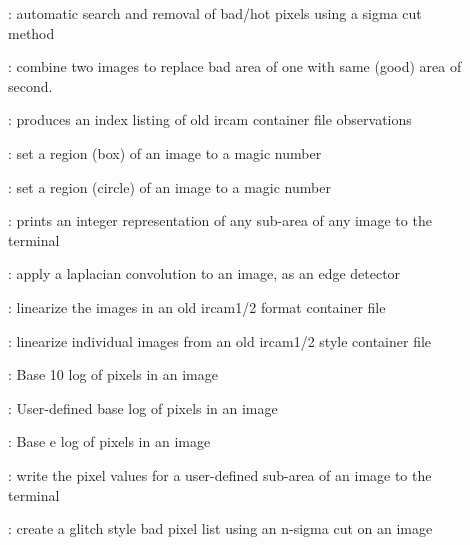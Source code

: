 \begin{description}
\begin{description}
\item []: automatic search and removal of
bad/hot pixels using a sigma cut method

\item []: combine two images to replace bad
area of one with same (good) area of second.

\item []: produces an index listing of old {\sc
ircam} container file observations

\item []: set a region (box) of an image to a
magic number

\item []: set a region (circle) of an image to
a magic number

\item []: prints an integer representation of any
sub-area of any image to the terminal


\item []: apply a laplacian convolution to an
image, as an edge detector

\item []: linearize the images in an old {\sc
ircam1/2} format container file

\item []: linearize individual
images from an old {\sc ircam1/2} style container file

\item []: Base 10 log of pixels in an image

\item []: User-defined base log of pixels in an image

\item []: Base e log of pixels in an image

\item []: write the pixel values for a user-defined
sub-area of an image to the terminal

\item []: create a glitch style bad pixel
list using an n-sigma cut on an image


\end{description}
\end{description}
